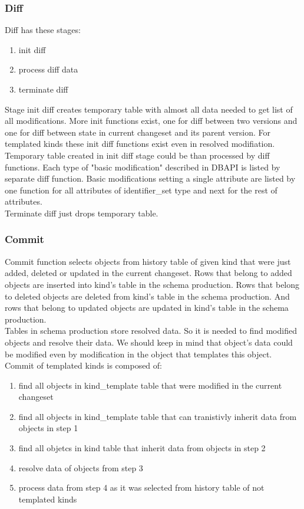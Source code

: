 \documentclass[deska]{subfiles}
\begin{document}
\subsubsection{Diff}

Diff has these stages:
\begin{enumerate}
	\item init diff
	\item process diff data
	\item terminate diff
\end{enumerate}
Stage init diff creates temporary table with almost all data needed to get list of all modifications.
More init functions exist, one for diff between two versions and one for diff between state in current changeset and its parent version. For templated kinds these init diff functions exist even in resolved modifiation.\\

Temporary table created in init diff stage could be than processed by diff functions. Each type of "basic modification" described in DBAPI is listed by separate diff function. Basic modifications setting a single attribute are listed by one function for all attributes of identifier\_set type and next for the rest of attributes.\\

Terminate diff just drops temporary table.

\subsubsection{Commit}
Commit function selects objects from history table of given kind that were just added, deleted or updated in the current changeset. Rows that belong to added objects are inserted into kind's table in the schema production. Rows that belong to deleted objects are deleted from kind's table in the schema production. And rows that belong to updated objects are updated in kind's table in the schema production.\\
Tables in schema production store resolved data. So it is needed to find modified objects and resolve their data. We should keep in mind that object's data could be modified even by modification in the object that templates this object.\\
Commit of templated kinds is composed of:
\begin{enumerate}
	\item find all objects in kind\_template table that were modified in the current changeset
	\item find all objects in kind\_template table that can tranistivly inherit data from objects in step 1
	\item find all objetcs in kind table that inherit data from objects in step 2
	\item resolve data of objects from step 3
	\item process data from step 4 as it was selected from history table of not templated kinds
\end{enumerate}
\end{document}
